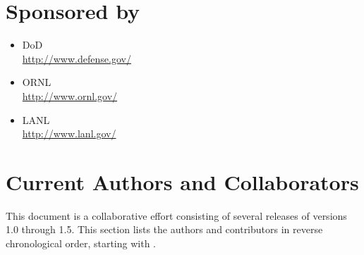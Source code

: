 \pagebreak{}

\section*{Sponsored by}
\begin{itemize}
\item \ac{DoD}\\
  \url{http://www.defense.gov/ }
\item \ac{ORNL}\\
  \url{http://www.ornl.gov/}
\item \ac{LANL}\\
  \url{http://www.lanl.gov/}
\end{itemize}

\section*{Current Authors and Collaborators}
This document is a collaborative effort consisting of several releases of \openshmem versions 1.0 through 1.5. This section lists the authors and contributors in reverse chronological order, starting with .


